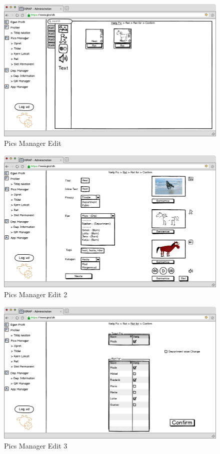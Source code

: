 \begin{figure}[!h]
\centering
\includegraphics[width=1\textwidth]{images/mockup/picsManagerEdit.png}
\caption{Pics Manager Edit}
\label{fig:pics_manager_edit}
\end{figure}

\newpage

\begin{figure}[!h]
\centering
\includegraphics[width=1\textwidth]{images/mockup/picsManagerEdit2.png}
\caption{Pics Manager Edit 2}
\label{fig:pics_manager_edit2}
\end{figure}

\FloatBarrier

\begin{figure}[!h]
\centering
\includegraphics[width=1\textwidth]{images/mockup/picsManagerEdit3.png}
\caption{Pics Manager Edit 3}
\label{fig:pics_manager_edit3}
\end{figure}

